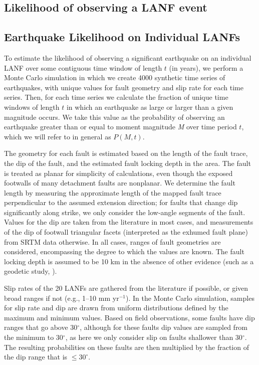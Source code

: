 \documentclass[twocolumn,grl]{AGUTeX}
\begin{document}
\begin{article}
\section{Likelihood of observing a LANF event}
\subsection{Earthquake Likelihood on Individual LANFs}
To estimate the likelihood of observing a significant earthquake on an
individual LANF over some contiguous time window of length $t$ (in years), we
perform a Monte Carlo simulation in which we create 4000 synthetic time series
of earthquakes, with unique values for fault geometry and slip rate for each
time series. Then, for each time series we calculate the fraction of unique
time windows of length $t$ in which an earthquake as large or larger than
a given magnitude occurs.  We take this value as the probability of observing
an earthquake greater than or equal to moment magnitude \emph{M} over time
period $t$, which we will refer to in general as $P(M,t)$.

The geometry for each fault is estimated based on the length of the fault
trace, the dip of the fault, and the estimated fault locking depth in the area.
The fault is treated as planar for simplicity of calculations, even though the
exposed footwalls of many detachment faults are nonplanar.  We determine the
fault length by measuring the approximate length of the mapped fault trace
perpendicular to the assumed extension direction; for faults that change dip
significantly along strike, we only consider the low-angle segments of the
fault.  Values for the dip are taken from the literature in most cases, and
measurements of the dip of footwall triangular facets (interpreted as the
exhumed fault plane) from SRTM data otherwise. In all cases, ranges of fault
geometries are considered, encompassing the degree to which the values are
known. The fault locking depth is assumed to be 10 km in the absence of other
evidence (such as a geodetic study, \citep[e.g.,][]{hreinsdottir2009altotib}).

Slip rates of the 20 LANFs are gathered from the literature if possible, or
given broad ranges if not (e.g., 1--10 mm yr$^{-1}$).  In the Monte Carlo
simulation, samples for slip rate and dip are drawn from uniform distributions
defined by the maximum and minimum values.  Based on field observations, some
faults have dip ranges that go above 30$^\circ$, although for these faults dip
values are sampled from the minimum to 30$^\circ$, as here we only consider
slip on faults shallower than 30$^\circ$. The resulting probabilities on these
faults are then multiplied by the fraction of the dip range that is
$\le30^\circ$.


\end{article}
\end{document}
